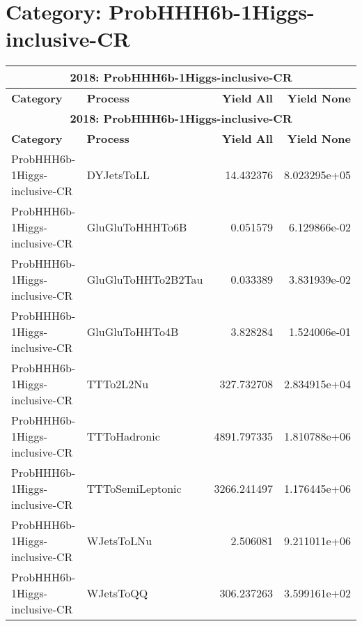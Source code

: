 \documentclass{article}
\begin{document}
\section*{Category: ProbHHH6b-1Higgs-inclusive-CR}
\begin{longtable}[c]{|l|l|r|r|}
\hline
\multicolumn{4}{|c|}{\textbf{2018: ProbHHH6b-1Higgs-inclusive-CR}} \\
\hline
\textbf{Category} & \textbf{Process} & \textbf{Yield All} & \textbf{Yield None} \\
\hline
\endfirsthead
\hline
\multicolumn{4}{|c|}{\textbf{2018: ProbHHH6b-1Higgs-inclusive-CR}} \\
\hline
\textbf{Category} & \textbf{Process} & \textbf{Yield All} & \textbf{Yield None} \\
\hline
\endhead
ProbHHH6b-1Higgs-inclusive-CR & DYJetsToLL & 14.432376 & 8.023295e+05 \\
\hline
ProbHHH6b-1Higgs-inclusive-CR & GluGluToHHHTo6B & 0.051579 & 6.129866e-02 \\
\hline
ProbHHH6b-1Higgs-inclusive-CR & GluGluToHHTo2B2Tau & 0.033389 & 3.831939e-02 \\
\hline
ProbHHH6b-1Higgs-inclusive-CR & GluGluToHHTo4B & 3.828284 & 1.524006e-01 \\
\hline
ProbHHH6b-1Higgs-inclusive-CR & TTTo2L2Nu & 327.732708 & 2.834915e+04 \\
\hline
ProbHHH6b-1Higgs-inclusive-CR & TTToHadronic & 4891.797335 & 1.810788e+06 \\
\hline
ProbHHH6b-1Higgs-inclusive-CR & TTToSemiLeptonic & 3266.241497 & 1.176445e+06 \\
\hline
ProbHHH6b-1Higgs-inclusive-CR & WJetsToLNu & 2.506081 & 9.211011e+06 \\
\hline
ProbHHH6b-1Higgs-inclusive-CR & WJetsToQQ & 306.237263 & 3.599161e+02 \\
\hline
\end{longtable}
\end{document}
